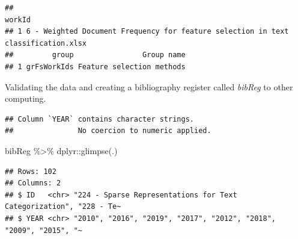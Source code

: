 \documentclass[
]{article}
\newenvironment{Shaded}{\begin{snugshade}}{\end{snugshade}}
\newcommand{\AttributeTok}[1]{\textcolor[rgb]{0.77,0.63,0.00}{#1}}
\newcommand{\DecValTok}[1]{\textcolor[rgb]{0.00,0.00,0.81}{#1}}
\newcommand{\FunctionTok}[1]{\textcolor[rgb]{0.00,0.00,0.00}{#1}}
\newcommand{\NormalTok}[1]{#1}
\newcommand{\OtherTok}[1]{\textcolor[rgb]{0.56,0.35,0.01}{#1}}
\newcommand{\SpecialCharTok}[1]{\textcolor[rgb]{0.00,0.00,0.00}{#1}}
\newcommand{\StringTok}[1]{\textcolor[rgb]{0.31,0.60,0.02}{#1}}
\begin{document}
\begin{verbatim}
##                                                                              workId
## 1 6 - Weighted Document Frequency for feature selection in text classification.xlsx
##         group                Group name
## 1 grFsWorkIds Feature selection methods
\end{verbatim}

Validating the data and creating a bibliography register called \emph{bibReg} to other computing.

\begin{Shaded}
\end{Shaded}

\begin{verbatim}
## Column `YEAR` contains character strings.
##               No coercion to numeric applied.
\end{verbatim}

\begin{Shaded}
\begin{Highlighting}[]
\NormalTok{bibReg }\SpecialCharTok{\%\textgreater{}\%}\NormalTok{ dplyr}\SpecialCharTok{::}\FunctionTok{glimpse}\NormalTok{(.)}
\end{Highlighting}
\end{Shaded}

\begin{verbatim}
## Rows: 102
## Columns: 2
## $ ID   <chr> "224 - Sparse Representations for Text Categorization", "228 - Te~
## $ YEAR <chr> "2010", "2016", "2019", "2017", "2012", "2018", "2009", "2015", "~
\end{verbatim}
\end{document}
